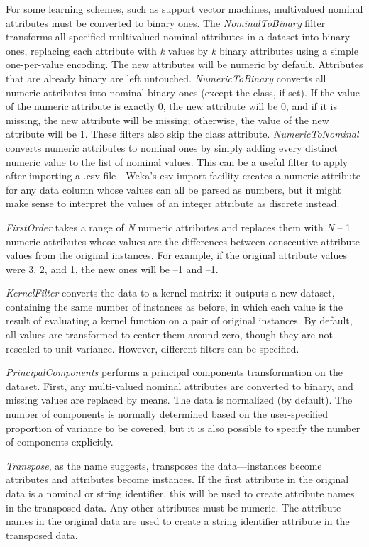 For some learning schemes, such as support vector machines,
multivalued nominal attributes must be converted to binary ones. The
\textit{NominalToBinary} filter transforms all specified multivalued
nominal attributes in a dataset into binary ones, replacing each
attribute with \textit{k} values by \textit{k} binary attributes using
a simple one-per-value encoding. The new attributes will be numeric by
default. Attributes that are already binary are left
untouched. \textit{NumericToBinary} converts all numeric attributes
into nominal binary ones (except the class, if set). If the value of
the numeric attribute is exactly 0, the new attribute will be 0, and
if it is missing, the new attribute will be missing; otherwise, the
value of the new attribute will be 1. These filters also skip the
class attribute. \textit{NumericToNominal} converts numeric attributes
to nominal ones by simply adding every distinct numeric value to the
list of nominal values. This can be a useful filter to apply after
importing a .csv file---Weka's csv import facility creates a numeric
attribute for any data column whose values can all be parsed as
numbers, but it might make sense to interpret the values of an integer
attribute as discrete instead.

\textit{FirstOrder} takes a range of \textit{N} numeric attributes and
replaces them with \textit{N} -- 1 numeric attributes whose values are the
differences between consecutive attribute values from the original
instances. For example, if the original attribute values were 3, 2,
and 1, the new ones will be --1 and --1.

\textit{KernelFilter} converts the data to a kernel matrix: it outputs a new
dataset, containing the same number of instances as before, in which
each value is the result of evaluating a kernel function on a pair of
original instances. By default, all values are transformed to center
them around zero, though they are not rescaled to unit
variance. However, different filters can be specified.

\textit{PrincipalComponents} performs a principal components
transformation on the dataset. First, any multi-valued nominal
attributes are converted to binary, and missing values are replaced by
means. The data is normalized (by default). The number of components
is normally determined based on the user-specified proportion of
variance to be covered, but it is also possible to specify the number
of components explicitly.

\textit{Transpose}, as the name suggests, transposes the
data---instances become attributes and attributes become instances. If
the first attribute in the original data is a nominal or string
identifier, this will be used to create attribute names in the
transposed data. Any other attributes must be numeric. The attribute
names in the original data are used to create a string identifier
attribute in the transposed data.

